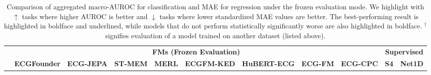 \documentclass{article}
\begin{document}
            \begin{table}[t]
                \centering
                \tiny
                \setlength{\tabcolsep}{2pt} %
                \caption{Comparison of aggregated macro-AUROC for classification and MAE for regression under the frozen evaluation mode. We highlight with $\uparrow$ tasks where higher AUROC is better and $\downarrow$ tasks where lower standardized MAE values are better. The best-performing result is highlighted in boldface and underlined, while models that do not perform statistically significantly worse are also highlighted in boldface. ${}^\dagger$ signifies evaluation of a model trained on another dataset (listed above).}
                \label{tab:frozen_result}
                \begin{tabular}{lcccccccccc}
                    \toprule
                    & \multicolumn{8}{c}{\textbf{FMs (Frozen Evaluation)}} &\multicolumn{2}{c}{\textbf{Supervised}} \\
                    \cmidrule(l){2-9}\cmidrule(l){10-11}
                     & \textbf{ECGFounder} & \textbf{ECG-JEPA} & \textbf{ST-MEM} & \textbf{MERL} & \textbf{ECGFM-KED} & \textbf{HuBERT-ECG} & \textbf{ECG-FM} & \textbf{ECG-CPC} & \textbf{S4} & \textbf{Net1D} \\
                    \midrule
        

\end{tabular}
\end{table}
\end{document}

